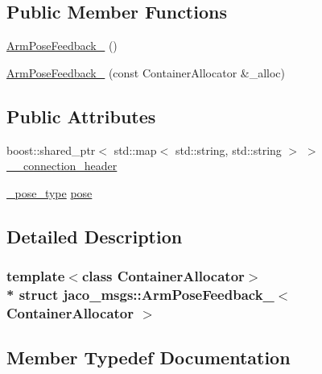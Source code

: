 \subsection*{Public Member Functions}
\begin{DoxyCompactItemize}
\item 
\hyperlink{structjaco__msgs_1_1ArmPoseFeedback___a91a286edc4e075110efec732f9fdccee}{Arm\+Pose\+Feedback\+\_\+} ()
\item 
\hyperlink{structjaco__msgs_1_1ArmPoseFeedback___a4b5b24c415331f7764b65818106a2b69}{Arm\+Pose\+Feedback\+\_\+} (const Container\+Allocator \&\+\_\+alloc)
\end{DoxyCompactItemize}
\subsection*{Public Attributes}
\begin{DoxyCompactItemize}
\item 
boost\+::shared\+\_\+ptr$<$ std\+::map$<$ std\+::string, std\+::string $>$ $>$ \hyperlink{structjaco__msgs_1_1ArmPoseFeedback___a9cd540560206df5d6d4329acfd3fd19e}{\+\_\+\+\_\+connection\+\_\+header}
\item 
\hyperlink{structjaco__msgs_1_1ArmPoseFeedback___afac74061a43c386a3dd24c0ce1324e5f}{\+\_\+pose\+\_\+type} \hyperlink{structjaco__msgs_1_1ArmPoseFeedback___a4a015f6a23c7830eff5fcb0036c1d98a}{pose}
\end{DoxyCompactItemize}


\subsection{Detailed Description}
\subsubsection*{template$<$class Container\+Allocator$>$\\*
struct jaco\+\_\+msgs\+::\+Arm\+Pose\+Feedback\+\_\+$<$ Container\+Allocator $>$}



\subsection{Member Typedef Documentation}
